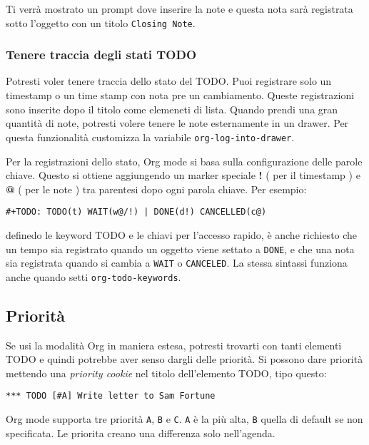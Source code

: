 \documentclass[11pt]{article}
\begin{document}
Ti verrà mostrato un prompt dove inserire la note e questa nota sarà
registrata sotto l'oggetto con un titolo \texttt{Closing Note}.

\subsubsection*{Tenere traccia degli stati TODO}
\label{sec:org76b4778}
Potresti voler tenere traccia dello stato del TODO. Puoi registrare
solo un timestamp o un time stamp con nota pre un cambiamento. Queste
registrazioni sono inserite dopo il titolo come elemeneti di
lista. Quando prendi una gran quantità di note, potresti volere tenere
le note esternamente in un drawer. Per questa funzionalità customizza
la variabile \texttt{org-log-into-drawer}.

Per la registrazioni dello stato, Org mode si basa sulla
configurazione delle parole chiave. Questo si ottiene aggiungendo un
marker speciale \textbf{!} ( per il timestamp ) e \textbf{@} ( per le note ) tra
parentesi dopo ogni parola chiave. Per esempio:

\begin{verbatim}
#+TODO: TODO(t) WAIT(w@/!) | DONE(d!) CANCELLED(c@)
\end{verbatim}


definedo le keyword TODO e le chiavi per l'accesso rapido, è anche
richiesto che un tempo sia registrato quando un oggetto viene settato
a \texttt{DONE}, e che una nota sia registrata quando si cambia a \texttt{WAIT} o
\texttt{CANCELED}. La stessa sintassi funziona anche quando setti
\texttt{org-todo-keywords}.

\subsection{Priorità}
\label{sec:org6fa8e75}
Se usi la modalità Org in maniera estesa, potresti trovarti con tanti
elementi TODO e quindi potrebbe aver senso dargli delle priorità. Si
possono dare priorità mettendo una \emph{priority cookie} nel titolo
dell'elemento TODO, tipo questo:

\begin{verbatim}
*** TODO [#A] Write letter to Sam Fortune
\end{verbatim}


Org mode supporta tre priorità \texttt{A}, \texttt{B} e \texttt{C}. \texttt{A} è la più alta, \texttt{B}
quella di default se non specificata. Le priorita creano una
differenza solo nell'agenda.
\end{document}
